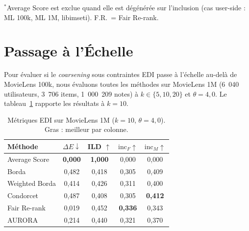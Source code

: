 \documentclass[12pt]{report}
\begin{document}
\begin{table}[h!]
\caption{Synthèse inter-domaines : meilleure méthode par métrique à
$k=10$ (ou le $k$ unique rapporté pour libimseti, RMP, OpenAlex).}
\label{tab:synthesis}
\centering
\footnotesize
{}
\par\smallskip
\footnotesize $^*$Average Score est exclue quand elle est dégénérée sur
l'inclusion (cas user-side : ML 100k, ML 1M, libimseti). F.R.\ = Fair
Re-rank.
\end{table}

\section{Passage à l'Échelle}
\label{sec:scalability}
Pour évaluer si le \emph{coarsening} sous contraintes EDI passe à
l'échelle au-delà de MovieLens 100k, nous évaluons toutes les méthodes
sur MovieLens 1M (6~040 utilisateurs, 3~706 items, 1~000~209 notes) à $k
\in \{5, 10, 20\}$ et $\theta = 4{,}0$. Le tableau~\ref{tab:1m} rapporte
les résultats à $k = 10$.
\begin{table}[h!]
\caption{Métriques EDI sur MovieLens 1M ($k=10$, $\theta=4{,}0$).
Gras : meilleur par colonne.}
\label{tab:1m}
\centering
\begin{tabular}{lcccc}
\hline
Méthode & $\Delta E \downarrow$ & ILD $\uparrow$ &
$\mathrm{inc}_F \uparrow$ & $\mathrm{inc}_M \uparrow$ \\
\hline
Average Score  & \textbf{0,000} & \textbf{1,000} & 0,000 & 0,000 \\
Borda          & 0,482 & 0,418 & 0,305 & 0,409 \\
Weighted Borda & 0,414 & 0,426 & 0,311 & 0,400 \\
Condorcet      & 0,487 & 0,408 & 0,305 & \textbf{0,412} \\
Fair Re-rank   & 0,019 & 0,452 & \textbf{0,336} & 0,343 \\
AURORA           & 0,214 & 0,440 & 0,321 & 0,370 \\
\hline
\end{tabular}
\end{table}
\end{document}

